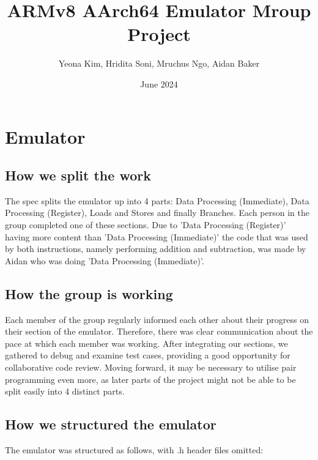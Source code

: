 \documentclass{article}
\title{ARMv8 AArch64 Emulator Mroup Project}
\author{Yeona Kim, Hridita Soni, Mruchus Ngo, Aidan Baker}
\date{June 2024}
\begin{document}
\maketitle

\tableofcontents

\section{Emulator}
\subsection{How we split the work}
The spec splits the emulator up into 4 parts: Data Processing (Immediate), Data Processing (Register), Loads and Stores and finally Branches. Each person in the group completed one of these sections. Due to 'Data Processing (Register)' having more content than 'Data Processing (Immediate)' the code that was used by both instructions, namely performing addition and subtraction, was made by Aidan who was doing 'Data Processing (Immediate)'.

\subsection{How the group is working}
Each member of the group regularly informed each other about their progress on their section of the emulator. Therefore, there was clear communication about the pace at which each member was working. After integrating our sections, we gathered to debug and examine test cases, providing a good opportunity for collaborative code review. Moving forward, it may be necessary to utilise pair programming even more, as later parts of the project might not be able to be split easily into 4 distinct parts.

\subsection{How we structured the emulator}
The emulator was structured as follows, with .h header files omitted:\\

\end{document}
